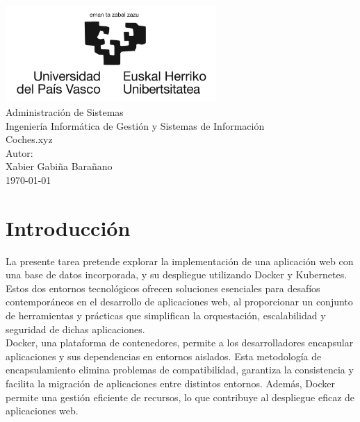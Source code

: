 \documentclass{report}
\begin{document}
    \begin{titlepage}
        \centering
        \includegraphics[width=0.6\textwidth]{./img/logo.jpg}\\
        \vspace{1cm}
        \LARGE Administración de Sistemas\\
        \vspace{0.5cm}
        \Large Ingeniería Informática de Gestión y Sistemas de Información\\
        \vspace{3cm}
        \Huge Coches.xyz\\
        \vspace{2.5cm}
        \Large Autor:\\
        \vspace{0.2cm}
        \large Xabier Gabiña Barañano\\
        \vfill
        \today
    \end{titlepage}

    \tableofcontents
    \chapter{Introducción}
        La presente tarea pretende explorar la implementación de una aplicación web con una base de datos incorporada, y su despliegue utilizando Docker y Kubernetes. Estos dos entornos tecnológicos ofrecen soluciones esenciales para desafíos contemporáneos en el desarrollo de aplicaciones web, al proporcionar un conjunto de herramientas y prácticas que simplifican la orquestación, escalabilidad y seguridad de dichas aplicaciones.\\

        Docker, una plataforma de contenedores, permite a los desarrolladores encapsular aplicaciones y sus dependencias en entornos aislados. Esta metodología de encapsulamiento elimina problemas de compatibilidad, garantiza la consistencia y facilita la migración de aplicaciones entre distintos entornos. Además, Docker permite una gestión eficiente de recursos, lo que contribuye al despliegue eficaz de aplicaciones web.\\
        
\end{document}
